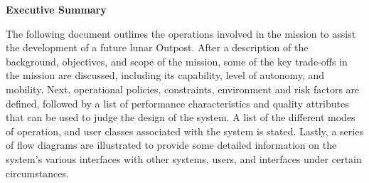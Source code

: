 
\vspace*{\fill}
\begin{center}
\large
\textbf{Executive Summary}
\end{center}

\normalsize
The following document outlines the operations involved in the mission to assist the development of a future lunar Outpost. After a description of the background, objectives, and scope of the mission, some of the key trade-offs in the mission are discussed, including its capability, level of autonomy, and mobility. Next, operational policies, constraints, environment and risk factors are defined, followed by a list of performance characteristics and quality attributes that can be used to judge the design of the system. A list of the different modes of operation, and user classes associated with the system is stated. Lastly, a series of flow diagrams are illustrated to provide some detailed information on the system's various interfaces with other systems, users, and interfaces under certain circumstances. 

\vspace*{\fill}

